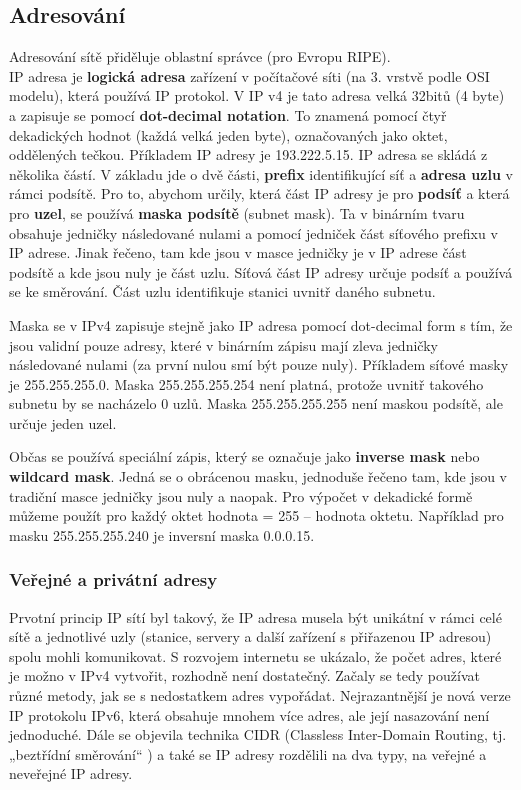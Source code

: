 \subsection{Adresování} 
Adresování sítě přiděluje oblastní správce (pro Evropu RIPE).\\
IP adresa je \textbf{logická adresa} zařízení v počítačové síti (na 3. vrstvě podle OSI modelu), která používá IP protokol. V IP v4 je tato adresa velká 32bitů (4 byte) a zapisuje se pomocí \textbf{dot-decimal notation}. To znamená pomocí čtyř dekadických hodnot (každá velká jeden byte), označovaných jako oktet, oddělených tečkou. Příkladem IP adresy je 193.222.5.15. 
IP adresa se skládá z několika částí. V základu jde o dvě části, \textbf{prefix} identifikující síť a \textbf{adresa uzlu} v rámci podsítě.
Pro to, abychom určily, která část IP adresy je pro \textbf{podsíť} a která pro \textbf{uzel}, se používá \textbf{maska podsítě} (subnet mask). Ta v binárním tvaru obsahuje jedničky následované nulami a pomocí jedniček část síťového prefixu v IP adrese. Jinak řečeno, tam kde jsou v masce jedničky je v IP adrese část podsítě a kde jsou nuly je část uzlu. Síťová část IP adresy určuje podsíť a používá se ke směrování. Část uzlu identifikuje stanici uvnitř daného subnetu.

Maska se v IPv4 zapisuje stejně jako IP adresa pomocí dot-decimal form s tím, že jsou validní pouze adresy, které v binárním zápisu mají zleva jedničky následované nulami (za první nulou smí být pouze nuly). Příkladem síťové masky je 255.255.255.0. Maska 255.255.255.254 není platná, protože uvnitř takového subnetu by se nacházelo 0 uzlů. Maska 255.255.255.255 není maskou podsítě, ale určuje jeden uzel.

Občas se používá speciální zápis, který se označuje jako \textbf{inverse mask} nebo \textbf{wildcard mask}. Jedná se o obrácenou masku, jednoduše řečeno tam, kde jsou v tradiční masce jedničky jsou nuly a naopak. Pro výpočet v dekadické formě můžeme použít pro každý oktet hodnota = 255 – hodnota oktetu. Například pro masku 255.255.255.240 je inversní maska 0.0.0.15.

\subsubsection*{Veřejné a privátní adresy}
Prvotní princip IP sítí byl takový, že IP adresa musela být unikátní v rámci celé sítě a jednotlivé uzly (stanice, servery a další zařízení s přiřazenou IP adresou) spolu mohli komunikovat. S rozvojem internetu se ukázalo, že počet adres, které je možno v IPv4 vytvořit, rozhodně není dostatečný. Začaly se tedy používat různé metody, jak se  s nedostatkem adres vypořádat. Nejrazantnější je nová verze IP protokolu IPv6, která obsahuje mnohem více adres, ale její nasazování není jednoduché. Dále se objevila technika CIDR (Classless Inter-Domain Routing, tj. „beztřídní směrování“ ) a také se IP adresy rozdělili na dva typy, na veřejné a neveřejné IP adresy.

